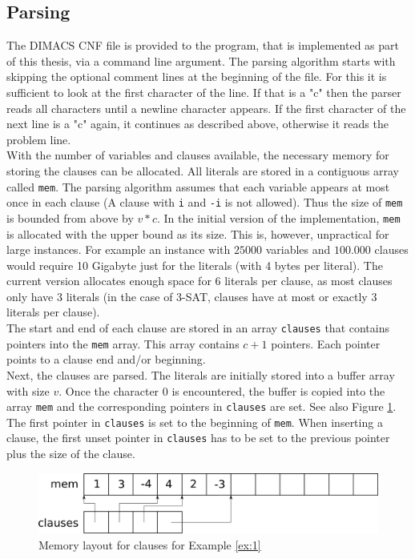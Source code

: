 \documentclass[12pt,a4paper]{article}
\begin{document}
\subsection{Parsing}
The DIMACS CNF file is provided to the program, that is implemented as part of this thesis, via a command line argument. The parsing algorithm starts with skipping the optional comment lines at the beginning of the file. For this it is sufficient to look at the first character of the line. If that is a "c" then the parser reads all characters until a newline character appears. If the first character of the next line is  a "c" again, it continues as described above, otherwise it reads the problem line.\\ With the number of variables and clauses available, the necessary memory for storing the clauses can be allocated. All literals are stored in a contiguous array called \texttt{mem}. The parsing algorithm assumes that each variable appears at most once in each clause (A clause with \texttt{i} and \texttt{-i} is not allowed). Thus the size of \texttt{mem} is bounded from above by $v * c$. In the initial version of the implementation, \texttt{mem} is allocated with the upper bound as its size. This is, however, unpractical for large instances. For example an instance with $25000$ variables and $100.000$  clauses would require 10 Gigabyte just for the literals (with 4 bytes per literal). The current version allocates enough space for 6 literals per clause, as most clauses only have 3 literals (in the case of 3-SAT, clauses have at most or exactly 3 literals per clause).\\
The start and end of each clause are stored in an array \texttt{clauses} that contains pointers into the \texttt{mem} array. This array contains $c+1$ pointers. Each pointer points to a clause end and/or beginning.\\

Next, the clauses are parsed. The literals are initially stored into a buffer array with size $v$. Once the character $0$ is encountered, the buffer is copied into the array \texttt{mem} and the corresponding pointers in \texttt{clauses} are set.  See also Figure \ref{fig:mem_clauses}. The first pointer in \texttt{clauses} is set to the beginning of \texttt{mem}. When inserting a clause, the first unset pointer in \texttt{clauses} has to be set to the previous pointer plus the size of the clause.
\begin{figure}
  \centering
  \includegraphics[width=\textwidth]{mem_clauses.png}
  \caption{Memory layout for clauses for Example \ref{ex:1}}
  \label{fig:mem_clauses}
\end{figure}
\end{document}
